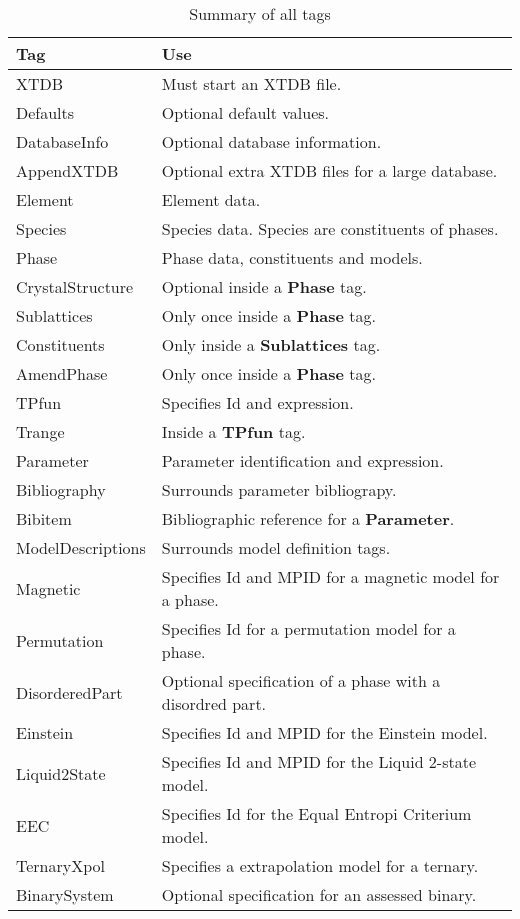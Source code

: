 \documentclass[10pt]{article}
\begin{document}
\begin{table}[!h]
  \caption{Summary of all tags}
\begin{tabular}{|p{} p{}|}\hline
  Tag        & Use \\\hline
  XTDB       &  Must start an XTDB file.\\
  Defaults   &  Optional default values.\\
  DatabaseInfo  & Optional database information.\\
  AppendXTDB &  Optional extra XTDB files for a large database.\\
  Element    &  Element data.\\
  Species    &  Species data.  Species are constituents of phases.\\
  Phase      &  Phase data, constituents and models.\\
  CrystalStructure  & Optional inside a {\bf Phase} tag.\\
  Sublattices & Only once inside a {\bf Phase} tag.\\
  Constituents  & Only inside a {\bf Sublattices} tag. \\ %
  AmendPhase &  Only once inside a {\bf Phase} tag.\\
  TPfun      &  Specifies Id and expression. \\
  Trange     &  Inside a {\bf TPfun} tag.\\
  Parameter  &  Parameter identification and expression. \\
  Bibliography  & Surrounds parameter bibliograpy. \\
  Bibitem       & Bibliographic reference for a {\bf Parameter}.\\
  ModelDescriptions  & Surrounds model definition tags.\\
  Magnetic    & Specifies Id and MPID for a magnetic model for a phase.\\
  Permutation & Specifies Id for a permutation model for a phase.\\
  DisorderedPart & Optional specification of a phase with a disordred part.\\%
  Einstein      & Specifies Id and MPID for the Einstein model.\\
  Liquid2State  & Specifies Id and MPID for the Liquid 2-state model.\\
  EEC           & Specifies Id for the Equal Entropi Criterium model.\\
  TernaryXpol   & Specifies a extrapolation model for a ternary.\\
  BinarySystem  & Optional specification for an assessed binary.\\\hline %
  \end{tabular}
\end{table}

\end{document}
